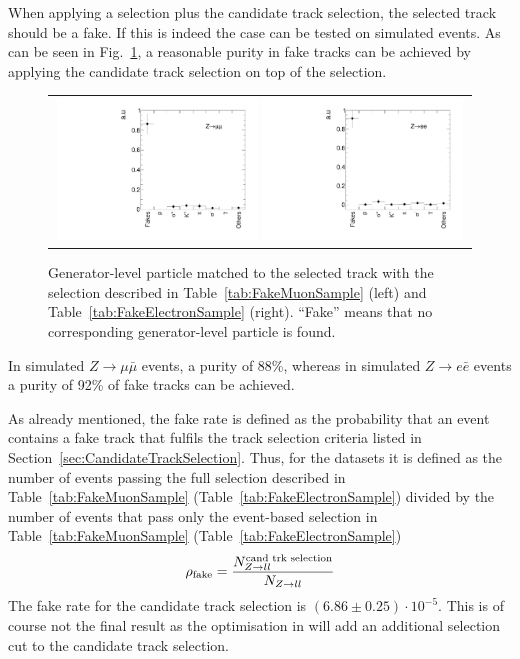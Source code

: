 When applying a \Zlep selection plus the candidate track selection, the selected track should be a fake.
If this is indeed the case can be tested on simulated \Zlep events.
As can be seen in Fig.~\ref{fig:BkgComposition}, a reasonable purity in fake tracks can be achieved by applying the candidate track selection on top of the \Zlep selection.
\begin{figure}[!b]
  \centering 
  \begin{tabular}{c}
    \includegraphics[width=0.49\textwidth]{figures/analysis/Background/ParticleCompositionInFakeCS_Mu.pdf}
    \includegraphics[width=0.49\textwidth]{figures/analysis/Background/ParticleCompositionInFakeCS_Ele.pdf}
  \end{tabular}
  \caption{Generator-level particle matched to the selected track with the selection described in Table~\ref{tab:FakeMuonSample} (left) and Table~\ref{tab:FakeElectronSample} (right). 
           ``Fake'' means that no corresponding generator-level particle is found. }
  \label{fig:BkgComposition}
\vspace{50pt}
\end{figure}
In simulated $Z\rightarrow\mu\bar{\mu}$ events, a purity of 88\%, whereas in simulated $Z\rightarrow e\bar{e}$ events a purity of 92\% of fake tracks can be achieved.


As already mentioned, the fake rate is defined as the probability that an event contains a fake track that fulfils the track selection criteria listed in Section~\ref{sec:CandidateTrackSelection}.
Thus, for the \Zlep datasets it is defined as the number of events passing the full selection described in Table~\ref{tab:FakeMuonSample} (Table~\ref{tab:FakeElectronSample}) divided by the number of events that pass only the event-based selection in Table~\ref{tab:FakeMuonSample} (Table~\ref{tab:FakeElectronSample})
\begin{equation*}
\rho_{\text{fake}} = \frac{N_{Z\rightarrow ll}^{\text{cand trk selection}}}{N_{Z\rightarrow ll}}
\end{equation*}
The fake rate for the candidate track selection is \eg $\left( 6.86 \pm 0.25 \right) \cdot 10^{-5}$. 
This is of course not the final result as the optimisation in \pt will add an additional \pt selection cut to the candidate track selection.

